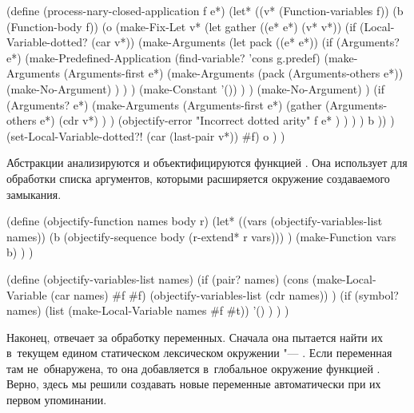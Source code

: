 \begin{code:lisp}
(define (process-nary-closed-application f e*)
  (let* ((v* (Function-variables f))
         (b  (Function-body f))
         (o (make-Fix-Let
             v*
             (let gather ((e* e*) (v* v*))
               (if (Local-Variable-dotted? (car v*))
                   (make-Arguments
                    (let pack ((e* e*))
                      (if (Arguments? e*)
                          (make-Predefined-Application
                           (find-variable? 'cons g.predef)
                           (make-Arguments
                            (Arguments-first e*)
                            (make-Arguments
                             (pack (Arguments-others e*))
                             (make-No-Argument) ) ) )
                          (make-Constant '()) ) )
                    (make-No-Argument) )
                   (if (Arguments? e*)
                       (make-Arguments (Arguments-first e*)
                                       (gather (Arguments-others e*)
                                               (cdr v*) ) )
                       (objectify-error
                        "Incorrect dotted arity" f e* ) ) ) )
             b )) )
    (set-Local-Variable-dotted?! (car (last-pair v*)) #f)
    o ) )
\end{code:lisp}

Абстракции анализируются и объектифицируются функцией .
Она использует  для обработки списка аргументов,
которыми расширяется окружение создаваемого замыкания.

\begin{code:lisp}
(define (objectify-function names body r)
  (let* ((vars (objectify-variables-list names))
         (b    (objectify-sequence body (r-extend* r vars))) )
    (make-Function vars b) ) )

(define (objectify-variables-list names)
  (if (pair? names)
      (cons (make-Local-Variable (car names) #f #f)
            (objectify-variables-list (cdr names)) )
      (if (symbol? names)
          (list (make-Local-Variable names #f #t))
          '() ) ) )
\end{code:lisp}

Наконец,  отвечает за обработку переменных. Сначала она
пытается найти их в~текущем едином статическом лексическом окружении "---
. Если переменная там не~обнаружена, то она добавляется в~глобальное
окружение функцией . Верно, здесь мы решили
создавать новые переменные автоматически при их первом упоминании.

